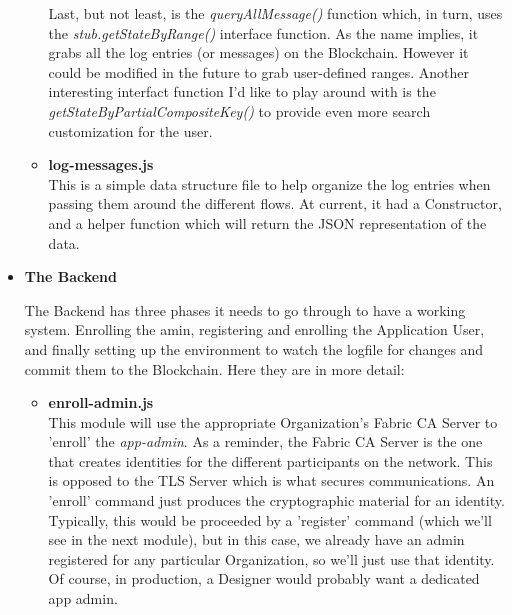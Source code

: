 \begin{itemize}
\begin{itemize}
							\hspace{10mm}Last, but not least, is the \textit{queryAllMessage()} function which, in turn, uses the \textit{stub.getStateByRange()} interface function. As the name implies, it grabs all the log entries (or messages) on the Blockchain. However it could be modified in the future to grab user-defined ranges. Another interesting interfact function I'd like to play around with is the \textit{getStateByPartialCompositeKey()} to provide even more search customization for the user.
							
						\item \textbf{log-messages.js}\\
						
							\hspace{10mm}This is a simple data structure file to help organize the log entries when passing them around the different flows. At current, it had a Constructor, and a helper function which will return the JSON representation of the data.
							
					\end{itemize}
	
			\item \textbf{The Backend}
			 					
				\hspace{10mm}The Backend has three phases it needs to go through to have a working system. Enrolling the amin, registering and enrolling the Application User, and finally setting up the environment to watch the logfile for changes and commit them to the Blockchain. Here they are in more detail:
				
					\begin{itemize}
					
						\item \textbf{enroll-admin.js}\\

							\hspace{10mm}This module will use the appropriate Organization's Fabric CA Server to 'enroll' the \textit{app-admin}. As a reminder, the Fabric CA Server is the one that creates identities for the different participants on the network. This is opposed to the TLS Server which is what secures communications. An 'enroll' command just produces the cryptographic material for an identity. Typically, this would be proceeded by a 'register' command (which we'll see in the next module), but in this case, we already have an admin registered for any particular Organization, so we'll just use that identity. Of course, in production, a Designer would probably want a dedicated app admin.\\
							

\end{itemize}
\end{itemize}
